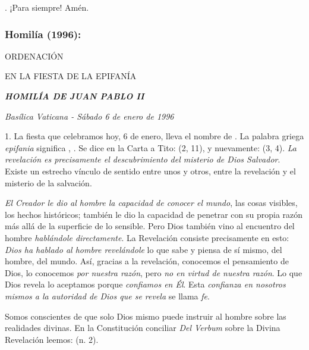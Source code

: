 \begin{body}
	. ¡Para siempre! Amén.
	
	\subsubsection{Homilía (1996): } ORDENACIÓN
	
	EN LA FIESTA DE LA EPIFANÍA
	
	\emph{\textbf{HOMILÍA DE JUAN PABLO II}}
	
	\emph{Basílica Vaticana - Sábado 6 de enero de 1996}
	
	1. La fiesta que celebramos hoy, 6 de enero, lleva el nombre de . La palabra griega \emph{epifania} significa , . Se dice en la Carta a Tito:  (2, 11), y nuevamente:  (3, 4). \emph{La revelación es precisamente el descubrimiento del misterio de Dios Salvador}. Existe un estrecho vínculo de sentido entre unos y otros, entre la revelación y el misterio de la salvación.
	
	\emph{El Creador le dio al hombre la capacidad de conocer el mundo}, las cosas visibles, los hechos históricos; también le dio la capacidad de penetrar con su propia razón más allá de la superficie de lo sensible. Pero Dios también vino al encuentro del hombre \emph{hablándole directamente}. La Revelación consiste precisamente en esto: \emph{Dios ha hablado al hombre revelándole} lo que sabe y piensa de sí mismo, del hombre, del mundo. Así, gracias a la revelación, conocemos el pensamiento de Dios, lo conocemos \emph{por nuestra razón}, pero \emph{no en virtud de nuestra razón}. Lo que Dios revela lo aceptamos porque \emph{confiamos en Él}. Esta \emph{confianza en nosotros mismos a la autoridad de Dios que se revela} se llama \emph{fe}.
	
	Somos conscientes de que solo Dios mismo puede instruir al hombre sobre las realidades divinas. En la Constitución conciliar \emph{Del Verbum} sobre la Divina Revelación leemos:  (n. 2).
	

\end{body}
